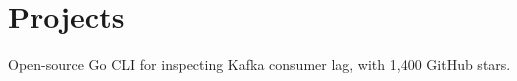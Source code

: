 \documentclass[]{deedy-resume-openfont}
\begin{document}
\begin{minipage}[t]{0.66\textwidth}
\section{Projects}
\begin{tightemize}
\item Open-source Go CLI for inspecting Kafka consumer lag, with 1,400 GitHub stars. %
\end{tightemize}
\sectionsep

\end{minipage}
\end{document}

